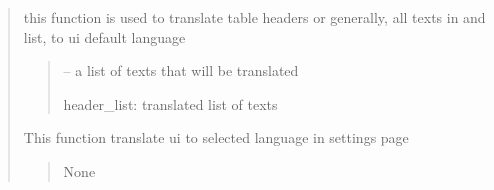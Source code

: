 \documentclass[letterpaper,10pt,english]{sphinxmanual}
\begin{document}
\begin{quote}
\begin{savenotes}
\begin{fulllineitems}

\begin{savenotes}\begin{fulllineitems}
\label{\detokenize{setting/setting_UI:oxin.setting_UI.UI_main_window.staticMetaObject}}
\pysigstartsignatures
{}
\pysigstopsignatures
\end{fulllineitems}\end{savenotes}


\begin{savenotes}\begin{fulllineitems}
\label{\detokenize{setting/setting_UI:oxin.setting_UI.UI_main_window.translate_headers_list}}
\pysigstartsignatures
{}
\pysigstopsignatures
\sphinxAtStartPar
this function is used to translate table headers or generally, all texts in and list, to ui default language
\begin{quote}\begin{description}
\sphinxAtStartPar
{} – a list of texts that will be translated

\sphinxAtStartPar
header\_list: translated list of texts

\end{description}\end{quote}

\end{fulllineitems}\end{savenotes}


\begin{savenotes}\begin{fulllineitems}
\label{\detokenize{setting/setting_UI:oxin.setting_UI.UI_main_window.translate_ui}}
\pysigstartsignatures
{}
\pysigstopsignatures
\sphinxAtStartPar
This function translate ui to selected language in settings page
\begin{quote}\begin{description}
\sphinxAtStartPar
None


\end{description}
\end{quote}
\end{fulllineitems}
\end{savenotes}
\end{fulllineitems}
\end{savenotes}
\end{quote}
\end{document}
